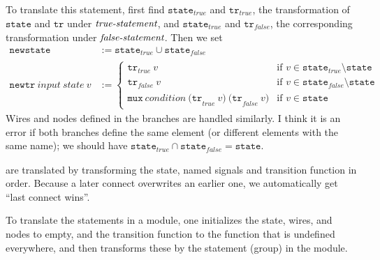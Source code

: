 \documentclass[a4paper]{article}
\begin{document}
\begin{description}
	To translate this statement, first find $\mathtt{state}_\mathit{true}$ and $\mathtt{tr}_\mathit{true}$, the transformation of $\mathtt{state}$ and $\mathtt{tr}$ under $\textit{\textmd{true-statement}}$,
	and $\mathtt{state}_\mathit{true}$ and $\mathtt{tr}_\mathit{false}$, the corresponding transformation under $\textit{\textmd{false-statement}}$.
	Then we set
	\begin{align*}
	\mathtt{newstate} & := \mathtt{state}_\mathit{true} \cup \mathtt{state}_\mathit{false} \\
	\mathtt{newtr~}\mathit{input}\mathtt{~}\mathit{state}\mathtt{~}v & :=
	\begin{cases}
		\mathtt{tr}_\mathit{true} \mathtt{~}v & \text{if } v \in \mathtt{state}_\mathit{true} \setminus \mathtt{state} \\
		\mathtt{tr}_\mathit{false}\mathtt{~}v & \text{if } v \in \mathtt{state}_\mathit{false} \setminus \mathtt{state} \\
		\mathtt{mux~}\mathit{condition}\mathtt{~(tr}_\mathit{true}\mathtt{~}v\mathtt{)~(tr}_\mathit{false}\mathtt{~}v\mathtt{)} & \text{if } v \in \mathtt{state}
	\end{cases}
	\end{align*}
	Wires and nodes defined in the branches are handled similarly.
	I think it is an error if both branches define the same element (or different elements with the same name);
	we should have $\mathtt{state}_\mathit{true} \cap \mathtt{state}_\mathit{false} = \mathtt{state}$.

\item[Statement groups]
	are translated by transforming the state, named signals and transition function in order.
	Because a later connect overwrites an earlier one,
	we automatically get ``last connect wins''.
\end{description}

To translate the statements in a module,
one initializes the state, wires, and nodes to empty, and the transition function to the function that is undefined everywhere,
and then transforms these by the statement (group) in the module.
\end{document}

